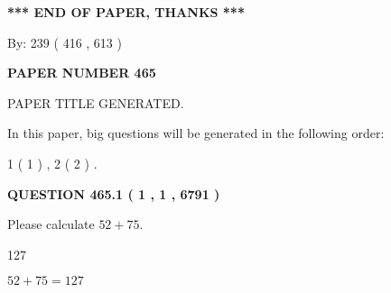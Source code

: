 \documentclass[12pt]{article}
\begin{document}
   
   
   
\vspace{1.0in} 
{\textbf{\large{ *** END OF PAPER, THANKS *** }}} 
   
   
\hspace{1.0in} By: 
 239 ( 416 ,  613 )
   
   
   
   
\newpage 
\setcounter{page}{ 
   465001 } 
   
   
   
   
 {\textbf{ \Large{ PAPER NUMBER  465  }}}
   
   
\vspace{0.2in}
   
   
   
   
   
   
   
   
 \vspace{0.2in}
 
 
 
 
   
   
 PAPER TITLE GENERATED.
   
   
   
\vspace{0.2in}
   
In this paper, big questions will be generated in the following order: 
   
   
   1 ( 1 )
 ,
   2 ( 2 )
 .
  
\vspace{0.2in}
  
{\textbf{\Large{QUESTION
465.1 
 ( 1 , 1 , 6791 )
}}}
  
  
 
Please calculate $ %
52 +  %
75 $.
 
 
 
\noindent{}
 
 

127
 
 
\noindent{}
 
 

 
 
 
\noindent{}
 
 

$ %
52 +  %
75=   %
127$
 
\end{document}
